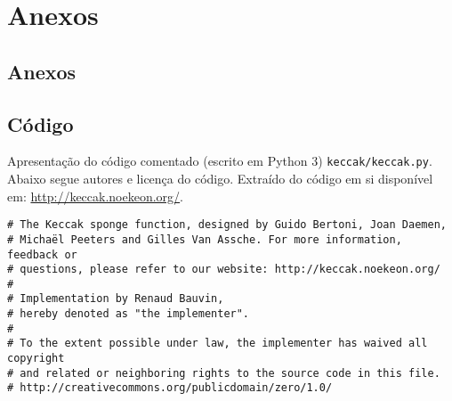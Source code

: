 \documentclass[12pt, a4paper]{article}
\begin{document}
\smallskip
\pagebreak

\section{Anexos}

\subsection{Anexos}
\label{saidasprograma}


\subsection{Código}
\label{codeprint}

Apresentação do código comentado (escrito em Python 3) \verb|keccak/keccak.py|.
Abaixo segue autores e licença do código. Extraído do código em si disponível
em: \href{http://keccak.noekeon.org/}{http://keccak.noekeon.org/}.

\begin{verbatim}
# The Keccak sponge function, designed by Guido Bertoni, Joan Daemen,
# Michaël Peeters and Gilles Van Assche. For more information, feedback or
# questions, please refer to our website: http://keccak.noekeon.org/
#
# Implementation by Renaud Bauvin,
# hereby denoted as "the implementer".
#
# To the extent possible under law, the implementer has waived all copyright
# and related or neighboring rights to the source code in this file.
# http://creativecommons.org/publicdomain/zero/1.0/
\end{verbatim}
\end{document}

